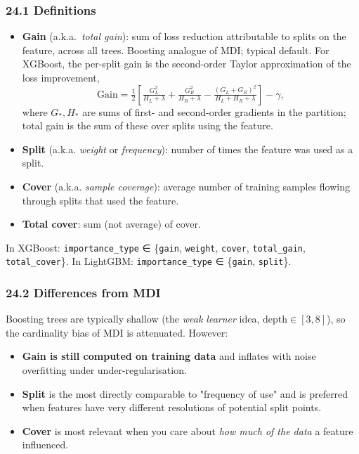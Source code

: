 \documentclass{article}
\providecommand{\tightlist}{\setlength{\itemsep}{0pt}\setlength{\parskip}{0pt}}
\begin{document}
\subsubsection{24.1 Definitions}\label{241-definitions}

\begin{itemize}
\tightlist
\item
  \textbf{Gain} (a.k.a.\ \emph{total gain}): sum of loss reduction
  attributable to splits on the feature, across all trees. Boosting
  analogue of MDI; typical default. For XGBoost, the per-split gain
  is the second-order Taylor approximation of the loss improvement,
  \[
  \mathrm{Gain} = \tfrac{1}{2}\!\left[ \tfrac{G_L^2}{H_L+\lambda} + \tfrac{G_R^2}{H_R+\lambda} - \tfrac{(G_L+G_R)^2}{H_L+H_R+\lambda} \right] - \gamma,
  \]
  where \(G_*, H_*\) are sums of first- and second-order gradients in
  the partition; total gain is the sum of these over splits using the
  feature.
\item
  \textbf{Split} (a.k.a. \emph{weight} or \emph{frequency}): number of
  times the feature was used as a split.
\item
  \textbf{Cover} (a.k.a. \emph{sample coverage}): average number of
  training samples flowing through splits that used the feature.
\item
  \textbf{Total cover}: sum (not average) of cover.
\end{itemize}

In XGBoost: \texttt{importance\_type} ∈ \{\texttt{gain},
\texttt{weight}, \texttt{cover}, \texttt{total\_gain},
\texttt{total\_cover}\}. In LightGBM: \texttt{importance\_type} ∈
\{\texttt{gain}, \texttt{split}\}.

\subsubsection{24.2 Differences from
MDI}\label{242-differences-from-mdi}

Boosting trees are typically shallow (the \emph{weak learner} idea,
\(\text{depth} \in [3, 8]\)), so the cardinality bias of MDI is
attenuated. However:

\begin{itemize}
\tightlist
\item
  \textbf{Gain is still computed on training data} and inflates with
  noise overfitting under under-regularisation.
\item
  \textbf{Split} is the most directly comparable to "frequency of use"
  and is preferred when features have very different resolutions of
  potential split points.
\item
  \textbf{Cover} is most relevant when you care about \emph{how much of
  the data} a feature influenced.
\end{itemize}
\end{document}
